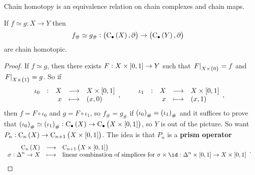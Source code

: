 \begin{exercise*}
Chain homotopy is an equivalence relation on chain complexes and chain maps.
\end{exercise*}

\begin{theorem}
If $ f \simeq g : X \to Y $ then
$$ f_\# \simeq g_\# : \br{\C_\bullet\br{X}, \da} \to \br{\C_\bullet\br{Y}, \da} $$
are chain homotopic.
\end{theorem}

\begin{proof}
If $ f \simeq g $, then there exists $ F : X \times \sbr{0, 1} \to Y $ such that $ \eval{F}_{X \times \cbr{0}} = f $ and $ \eval{F}_{X \times \cbr{1}} = g $. So if
$$ \function[\iota_0]{X}{X \times \sbr{0, 1}}{x}{\br{x, 0}}, \qquad \function[\iota_1]{X}{X \times \sbr{0, 1}}{x}{\br{x, 1}}, $$
then $ f = F \circ \iota_0 $ and $ g = F \circ \iota_1 $, so $ f_\# = g_\# $ if $ \br{\iota_0}_\# = \br{\iota_1}_\# $ and it suffices to prove that $ \br{\iota_0}_\# \simeq \br{\iota_1}_\# : \C_\bullet\br{X} \to \C_\bullet\br{X \times \sbr{0, 1}} $, so $ Y $ is out of the picture. So want $ P_n : \C_n\br{X} \to \C_{n + 1}\br{X \times \sbr{0, 1}} $. The idea is that $ P_n $ is a \textbf{prism operator}
$$ \function{\C_n\br{X}}{\C_{n + 1}\br{X \times \sbr{0, 1}}}{\sigma : \Delta^n \to X}{\text{linear combination of simplices for} \ \sigma \times \id : \Delta^n \times \sbr{0, 1} \to X \times \sbr{0, 1}}. $$

\pagebreak


\end{proof}
